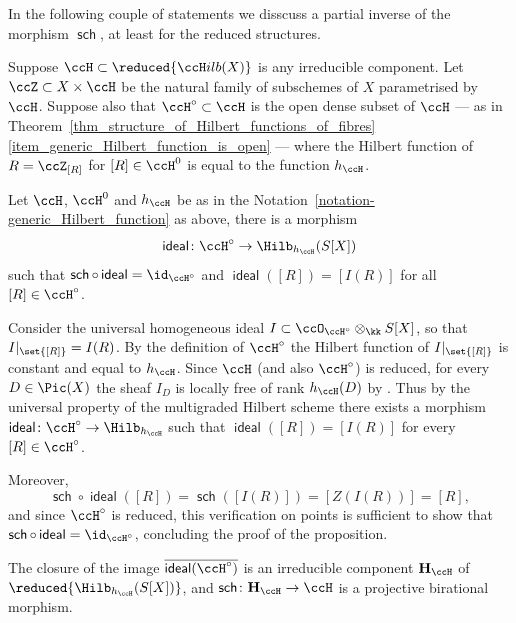 \documentclass[12pt,a4paper]{article}
\newcommand{\usualHilb}{{\ccH}ilb}
\DeclareMathOperator{\sch}{\mathsf {sch}}
\DeclareMathOperator{\idealmap}{\mathsf {ideal}}
\begin{document}
In the following couple of statements we disscuss  a partial inverse of the morphism $\sch$, at least for the reduced structures.

\begin{notation}\label{notation-generic_Hilbert_function}
Suppose $\ccH\subset \reduced{\usualHilb(X)}$ is any irreducible component.
Let $\ccZ \subset X \times \ccH$ be the natural family of subschemes of $X$ parametrised by $\ccH$.
Suppose also that $\ccH^{\circ}\subset \ccH$ is the open dense subset of $\ccH$
  --- as in Theorem~\ref{thm_structure_of_Hilbert_functions_of_fibres}\ref{item_generic_Hilbert_function_is_open} ---
  where the Hilbert function of $R=\ccZ_{[R]}$ for $[R]\in \ccH^0$ is equal to the function  $h_{\ccH}$.  
\end{notation}

\begin{prop}
\label{prop_idealmap}
Let $\ccH$, $\ccH^0$ and $h_{\ccH}$ be as in the Notation~\ref{notation-generic_Hilbert_function}  as above,
 there is a morphism
  \[
    \idealmap \colon \ccH^{\circ} \to \Hilb_{h_{\ccH}}(S[X])
  \]
 such that $\sch \circ \idealmap = \id_{\ccH^{\circ}}$ and $\idealmap([R]) = [I(R)]$ for all $[R]\in \ccH^{\circ}$.
\end{prop}

\begin{prf}
  Consider the universal homogeneous ideal $I \subset \ccO_{\ccH^{\circ}} \otimes_{\kk} S[X]$, so that $I|_{\set{[R]}} = I(R)$.
  By the definition of $\ccH^{\circ}$ the Hilbert function of $I|_{\set{[R]}}$ is constant and equal to $h_{\ccH}$.
  Since $\ccH$ (and also $\ccH^{\circ}$) is reduced, for every $D\in \Pic(X)$ the sheaf $I_D$ is locally free of rank $h_{\ccH}(D)$ by \cite[Lem.~II.8.9]{hartshorne}.
  Thus by the universal property of the multigraded Hilbert scheme there exists a morphism $\idealmap \colon \ccH^{\circ} \to \Hilb_{h_\ccH}$
  such that $\idealmap([R]) = [I(R)]$ for every $[R]\in \ccH^{\circ}$.

  Moreover,
  \[
   \sch \circ \idealmap([R]) = \sch([I(R)]) = [Z(I(R))]= [R],
  \]
  and since $\ccH^{\circ}$ is reduced, this verification on points is sufficient to show that
  $\sch \circ \idealmap = \id_{\ccH^{\circ}}$, concluding the proof of the proposition.
\end{prf}

\begin{cor}
\label{cor_saturation_map_is_birational}
  The closure of the image
    $\overline{\idealmap(\ccH^{\circ})}$ is an irreducible component $\mathbf{H}_{\ccH}$ of $\reduced{\Hilb_{h_{\ccH}}(S[X])}$,
    and $\sch\colon\mathbf{H}_{\ccH} \to \ccH$ is a projective birational morphism.
\end{cor}
\end{document}
